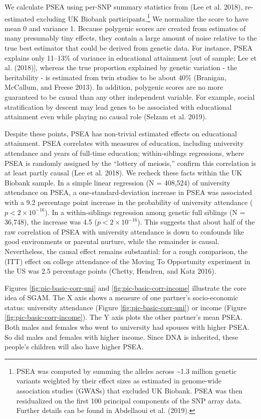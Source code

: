 \documentclass[
]{article}
\begin{document}
We calculate PSEA using per-SNP summary statistics from (Lee et al. 2018),
re-estimated excluding UK Biobank participants.\footnote{PSEA was computed by summing the alleles across \textasciitilde1.3 million
  genetic variants weighted by their effect sizes as estimated in
  genome-wide association studies (GWASs) that excluded UK Biobank.
  PSEA was then residualized on the first 100 principal components of
  the SNP array data. Further details can be found in
  Abdellaoui et al. (2019).} We normalize the score to
have mean 0 and variance 1. Because polygenic scores are created from estimates
of many presumably tiny effects, they contain a large amount of noise relative
to the true best estimator that could be derived from genetic data. For
instance, PSEA explains only 11--13\% of variance in educational attainment {[}out
of sample; Lee et al. (2018){]}, whereas the true proportion explained by genetic
variation - the heritability - is estimated from twin studies to be about 40\%
(Branigan, McCallum, and Freese 2013). In addition, polygenic scores are no more guaranteed
to be causal than any other independent variable. For example, social
stratification by descent may lead genes to be associated with educational
attainment even while playing no causal role (Selzam et al. 2019).

Despite these points, PSEA has non-trivial estimated effects on educational
attainment. PSEA correlates with measures of education, including university
attendance and years of full-time education; within-siblings regressions, where
PSEA is randomly assigned by the ``lottery of meiosis,'' confirm this correlation
is at least partly causal (Lee et al. 2018). We recheck these facts within the UK
Biobank sample. In a simple linear regression (N = 408,524) of
university attendance on PSEA, a one-standard-deviation increase in PSEA was
associated with a 9.2 percentage point increase in the
probability of university attendance (\(p < 2 \times 10^{-16}\)). In a
within-siblings regression among genetic full siblings (N =
36,748), the increase was
4.5 (\(p < 2 \times 10^{-16}\)). This suggests
that about half of the raw correlation of PSEA with university attendance is
down to confounds like good environments or parental nurture, while the
remainder is causal. Nevertheless, the causal effect remains substantial: for a
rough comparison, the (ITT) effect on college attendance of the Moving To
Opportunity experiment in the US was 2.5 percentage points (Chetty, Hendren, and Katz 2016).

Figures \ref{fig:pic-basic-corr-uni} and
\ref{fig:pic-basic-corr-income} illustrate the core idea of
SGAM. The X axis shows a measure of one partner's socio-economic status:
university attendance (Figure \ref{fig:pic-basic-corr-uni}) or income
(Figure \ref{fig:pic-basic-corr-income}). The Y axis plots the other
partner's mean PSEA. Both males and females who went to university had
spouses with higher PSEA. So did males and females with higher income.
Since DNA is inherited, these people's children will also have higher
PSEA.
\end{document}
